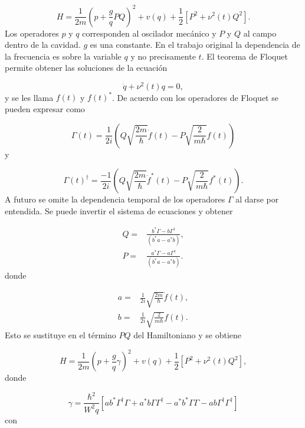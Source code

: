 \documentclass[10pt,a4paper]{report}
\begin{document}
\begin{equation}
H = \frac{1}{2m}(p + \frac{g}{q} PQ)^2 + v(q) + \frac{1}{2}[P^2+\nu^2 (t)Q^2].
\end{equation} Los operadores $p$ y $q$ corresponden al oscilador mecánico y $P$ y $Q$ al campo dentro de la cavidad. $g$ es una constante. En el trabajo original la dependencia de la frecuencia es sobre la variable $q$ y no precisamente $t$. El teorema de Floquet permite obtener las soluciones de la ecuación

\begin{equation}
\ddot{q} + \nu^2(t)q=0,
\end{equation} y se les llama $f(t)$ y $f(t)^*$. De acuerdo con \cite{HanngiFM} los operadores de Floquet se pueden expresar como

\begin{equation}
\Gamma(t) = \frac{1}{2i}(Q\sqrt{\frac{2m}{\hbar}}\dot{f}(t)-P\sqrt{\frac{2}{m\hbar}}f(t))
\end{equation} y

\begin{equation}
\Gamma(t)^\dagger = \frac{-1}{2i}(Q\sqrt{\frac{2m}{\hbar}}\dot{f}^*(t)-P\sqrt{\frac{2}{m\hbar}}f^*(t)).
\end{equation} A futuro se omite la dependencia temporal de los operadores $\Gamma$ al darse por entendida. Se puede invertir el sistema de ecuaciones y obtener

\begin{align}
Q =& \frac{b^* \Gamma - b \Gamma^\dagger}{(b^* a - a^*b)},\\
P =& \frac{a^* \Gamma - a \Gamma^\dagger}{(b^* a - a^*b)}.
\end{align} donde

\begin{align}
a =& \frac{1}{2i}\sqrt{\frac{2m}{\hbar}} \dot{f}(t),\\
b =& \frac{1}{2i}\sqrt{\frac{2}{m\hbar}} f(t).
\end{align} Esto se sustituye en el término $PQ$ del Hamiltoniano y se obtiene

\begin{equation}
H = \frac{1}{2m}(p + \frac{g}{q} \gamma)^2 + v(q) + \frac{1}{2}[P^2+\nu^2 (t)Q^2],
\end{equation} donde

\begin{equation}
\gamma = \frac{\hbar^2}{W^2 q}[ab^*\Gamma^\dagger \Gamma + a^*b \Gamma \Gamma^\dagger - a^*b^* \Gamma \Gamma - ab \Gamma^\dagger \Gamma^\dagger]
\end{equation} con
\end{document}
